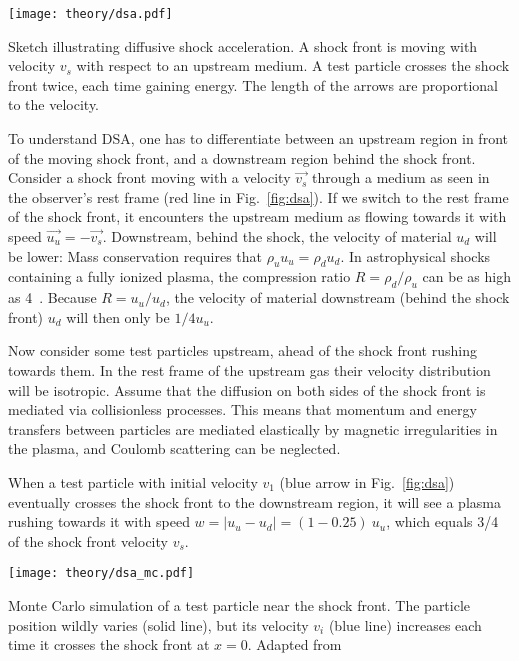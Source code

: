 \begin{marginfigure}
    \texttt{[image: theory/dsa.pdf]}
    \caption[Diffusive shock acceleration]{Sketch illustrating diffusive shock acceleration. A shock front is moving with velocity $v_s$ with respect to an upstream medium. A test particle crosses the shock front twice, each time gaining energy. The length of the arrows are proportional to the velocity.}
\end{marginfigure}

To understand DSA, one has to differentiate between an upstream region in front of the moving shock front, and a downstream region behind the shock front. Consider a shock front moving with a velocity $\vec{v_s}$ through a medium as seen in the observer's rest frame (red line in Fig.~\ref{fig:dsa}). If we switch to the rest frame of the shock front, it encounters the upstream medium as flowing towards it with speed $\vec{u_u}=-\vec{v_s}$. Downstream, behind the shock, the velocity of material $u_d$ will be lower: Mass conservation requires that $\rho_u u_u = \rho_d u_d$. In astrophysical shocks containing a fully ionized plasma, the compression ratio $R=\rho_d/\rho_u$ can be as high as 4~. Because $R=u_u/u_d$, the velocity of material downstream (behind the shock front) $u_d$ will then only be $1/4 u_u$.

Now consider some test particles upstream, ahead of the shock front rushing towards them. In the rest frame of the upstream gas their velocity distribution will be isotropic. Assume that the diffusion on both sides of the shock front is mediated via collisionless processes. This means that momentum and energy transfers between particles are mediated elastically by magnetic irregularities in the plasma, and Coulomb scattering can be neglected.

When a test particle with initial velocity $v_1$ (blue arrow in Fig.~\ref{fig:dsa}) eventually crosses the shock front to the downstream region, it will see a plasma rushing towards it with speed $w=|u_u-u_d| = (1-0.25)~u_u$, which equals 3/4 of the shock front velocity $v_s$.

\begin{marginfigure}
    \texttt{[image: theory/dsa\_mc.pdf]}
    \caption[DSA Monte Carlo]{Monte Carlo simulation of a test particle near the shock front. The particle position wildly varies (solid line), but its velocity $v_i$ (blue line) increases each time it crosses the shock front at $x=0$. Adapted from~\cite{Baring1997}}
\end{marginfigure}

